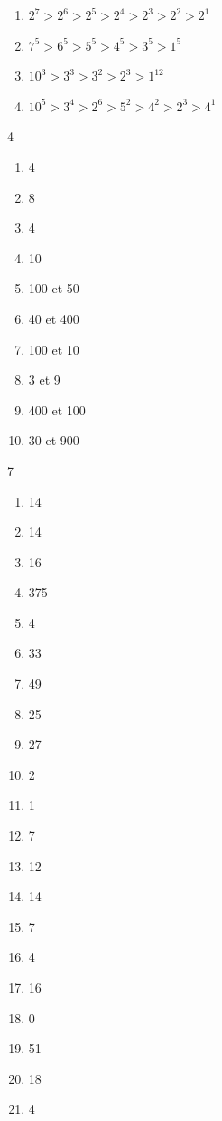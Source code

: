 \newpage
{}
\vspace{-15pt}\begin{enumerate}[leftmargin=*,align=parleft, label=\alph*)]
\item $2^7 > 2^6 > 2^5 > 2^4 > 2^3 > 2^2 > 2^1$
\item $7^5 > 6^5 > 5^5 > 4^5 > 3^5 > 1^5$
\item $10^3 > 3^3 > 3^2 > 2^3 > 1^{12}$
\item $10^5 > 3^4 > 2^6 > 5^2 > 4^2 > 2^3 > 4^1$
\end{enumerate}

\vspace{-5pt}
\vspace{-15pt}\begin{multicols}{4}
\begin{enumerate}[leftmargin=*,align=parleft, label=\alph*)]
\item 4
\item 8
\item 4
\item 10 
\item 100 et 50
\item 40 et 400
\item 100 et 10  
\item 3 et 9 
\item 400 et 100
\item 30 et 900
\end{enumerate}
\end{multicols}

\vspace{20pt}

\begin{multicols}{7}
\vspace{-15pt}\begin{enumerate}[leftmargin=*,align=parleft, label=\alph*)]
\item 14
\item 14
\item 16
\item 375
\item 4
\item 33
\item 49
\item 25
\item 27
\item 2
\item 1
\item 7
\item 12
\item 14
\item 7
\item 4
\item 16
\item 0
\item 51
\item 18
\item 4
\end{enumerate}
\end{multicols}

